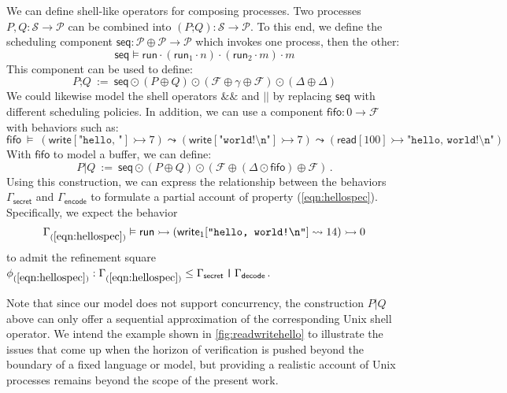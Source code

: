 \documentclass[acmsmall,screen,review,nonacm]{acmart}
\newcommand{\kw}[1]{\ensuremath{ \mathsf{#1} }}
\newcommand{\emptysig}{0}
\begin{document}
\begin{example}\label{ex:compse-proc} %
We can define shell-like operators for composing processes.
Two processes $P, Q : \mathcal{S} \rightarrow \mathcal{P}$
can be combined into
$(P \mathbin\texttt{;} Q) : \mathcal{S} \rightarrow \mathcal{P}$.
To this end,
we define the scheduling component
$\kw{seq} : \mathcal{P} \oplus \mathcal{P} \rightarrow \mathcal{P}$
which invokes one process, then the other:
\[
  \kw{seq} \vDash
    \kw{run} \cdot (\kw{run}_1 \cdot n) \cdot (\kw{run}_2 \cdot m) \cdot m
\]
This component can be used to define:
\[
  P \mathbin\texttt{;} Q \: := \:
    \kw{seq} \odot (P \oplus Q)
             \odot (\mathcal{F} \oplus \gamma \oplus \mathcal{F})
             \odot (\Delta \oplus \Delta)
\]
We could likewise model the shell operators $\texttt{\&\&}$ and $\texttt{||}$
by replacing $\kw{seq}$ with different scheduling policies.
In addition,
we can use a component
$\kw{fifo} : \emptysig \rightarrow \mathcal{F}$
with behaviors such as:
{\small
\[
  \kw{fifo} \: \vDash \:
    (\kw{write}[\texttt{"hello, "}] \rightarrowtail 7) \leadsto
    (\kw{write}[\texttt{"world!\textbackslash{}n"}] \rightarrowtail 7) \leadsto
    (\kw{read}[100] \rightarrowtail \texttt{"hello, world!\textbackslash{}n"})
\]
}%
With $\kw{fifo}$ to model a buffer,
we can define:
\[
  P \mathbin\texttt{|} Q \: := \:
    \kw{seq} \odot (P \oplus Q)
         \odot (\mathcal{F} \oplus (\Delta \odot \kw{fifo}) \oplus \mathcal{F})
  \,.
\]
Using this construction,
we can express the relationship between the behaviors
$\Gamma_\kw{secret}$ and $\Gamma_\kw{encode}$
to formulate a partial account of property (\ref{eqn:hellospec}).
Specifically,
we expect the behavior
\[
  \Gamma_{(\ref{eqn:hellospec})} \vDash \kw{run}
    \rightarrowtail (\kw{write}_1[\texttt{"hello, world!\textbackslash{}n"}] \leadsto 14)
    \rightarrowtail 0
\]
to admit the refinement square
$
  \phi_{(\ref{eqn:hellospec})} :
  \Gamma_{(\ref{eqn:hellospec})} \le
  \Gamma_\kw{secret} \mathbin{\texttt{|}} \Gamma_\kw{decode}
$.

Note that since our model does not support concurrency,
the construction $P \mathbin{\texttt{|}} Q$ above
can only offer a sequential approximation of
the corresponding Unix shell operator.
We intend the example shown in
\autoref{fig:readwritehello}
to illustrate the issues that come up
when the horizon of verification
is pushed beyond the boundary of a fixed language or model,
but providing a realistic account of Unix processes
remains beyond the scope of the present work.
\end{example}
\end{document}

